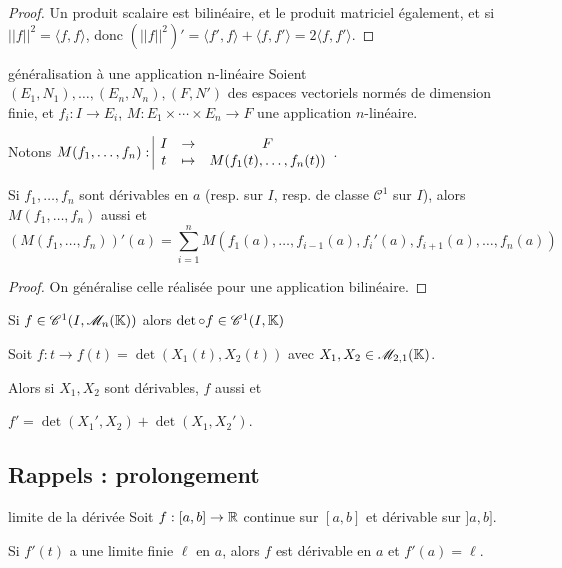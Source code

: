 \documentclass{prepacours}
\begin{document}

\begin{proof}
    Un produit scalaire est bilinéaire, et le produit matriciel également, et si 
    $||f||^2 = \langle f, f \rangle$, donc $(||f||^2)' = \langle f', f \rangle + \langle f, f' \rangle = 2 \langle f, f' \rangle$.
\end{proof}

\begin{theoreme}{généralisation à une application n-linéaire}{}
    Soient $(E_1, N_1), \ldots, (E_n, N_n), (F, N')$ des espaces vectoriels normés de dimension finie, et
    $f_i : I \to E_i$, $M : E_1 \times \cdots \times E_n \to F$ une application $n$-linéaire.

    Notons $M(f_1, \ldots, f_n): \space \begin{array}{|ccc} I & \to & F \\ t & \mapsto & M(f_1(t), \ldots, f_n(t)) \end{array}$.

    Si $f_1, \ldots, f_n$ sont dérivables en $a$ (resp. sur $I$, resp. de classe $\mathscr C^1$ sur $I$),
    alors $M(f_1, \ldots, f_n)$ aussi et 
    $$(M(f_1, \ldots, f_n))'(a) = \sum_{i=1}^n M(f_1(a), \ldots, f_{i-1}(a), f_i'(a), f_{i+1}(a), \ldots, f_n(a))$$
\end{theoreme}

\begin{proof}
    On généralise celle réalisée pour une application bilinéaire.
\end{proof}

\begin{corollaire}{}{}
    Si $f \in \mathscr C^1(I, \mathscr M_n(\mathbb{K}))$ alors $\det \circ f \in \mathscr C^1(I, \mathbb{K})$
\end{corollaire}

\begin{exemple}
    Soit $f: t \to f(t) = \det(X_1(t), X_2(t))$ avec $X_1, X_2 \in \mathscr M_{2, 1}(\mathbb{K})$. 

    Alors si $X_1, X_2$ sont dérivables, $f$ aussi et 

    $f' = \det(X_1', X_2) + \det(X_1, X_2')$.
\end{exemple}

\subsection{Rappels : prolongement }

\begin{theoreme}{limite de la dérivée}{}
    Soit $f : [a, b] \to \mathbb{R}$ continue sur $[a, b]$ et dérivable sur $]a, b]$. 

    Si $f'(t)$ a une limite finie $\ell$ en $a$, alors $f$ est dérivable en $a$ et $f'(a) = \ell$.

\end{theoreme}
\end{document}
